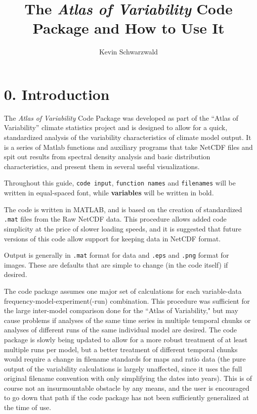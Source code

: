 \documentclass{article}
\title{The \textit{Atlas of Variability} Code Package and How to Use It}
\author{Kevin Schwarzwald}
\begin{document}
\maketitle

\tableofcontents

\section*{0. Introduction}
The \textit{Atlas of Variability} Code Package was developed as part of the ``Atlas of Variability'' climate statistics project and is designed to allow for a quick, standardized analysis of the variability characteristics of climate model output. It is a series of Matlab functions and auxiliary programs that take NetCDF files and spit out results from spectral density analysis and basic distribution characteristics, and present them in several useful visualizations. 

Throughout this guide, \texttt{code input}, \texttt{function names} and \texttt{filenames} will be written in equal-spaced font, while \textbf{variables} will be written in bold. 

The code is written in MATLAB, and is based on the creation of standardized \texttt{.mat} files from the Raw NetCDF data. This procedure allows added code simplicity at the price of slower loading speeds, and it is suggested that future versions of this code allow support for keeping data in NetCDF format. 

Output is generally in \texttt{.mat} format for data and \texttt{.eps} and \texttt{.png} format for images. These are defaults that are simple to change (in the code itself) if desired.

The code package assumes one major set of calculations for each variable-data frequency-model-experiment(-run) combination. This procedure was sufficient for the large inter-model comparison done for the ``Atlas of Variability," but may cause problems if analyses of the same time series in multiple temporal chunks or analyses of different runs of the same individual model are desired. The code package is slowly being updated to allow for a more robust treatment of at least multiple runs per model, but a better treatment of different temporal chunks would require a change in filename standards for maps and ratio data (the pure output of the variability calculations is largely unaffected, since it uses the full original filename convention with only simplifying the dates into years). This is of course not an insurmountable obstacle by any means, and the user is encouraged to go down that path if the code package has not been sufficiently generalized at the time of use. 
\end{document}
